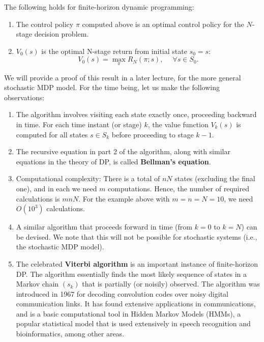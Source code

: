 \begin{proposition}
The following holds for finite-horizon dynamic programming:
\begin{enumerate}
  \item The control policy $\pi $ computed above is an optimal control policy for the $N$-stage decision problem.
  \item $V_0^{}(s)$ is the optimal N-stage return from initial state ${s_0} = s$:
\[{V_0}(s) = \mathop {\max }\limits_\pi  {R_N}(\pi ;s),\;\quad \forall s \in {S_0}.\]
\end{enumerate}
\end{proposition}

We will provide a proof of this result in a later lecture, for the more general stochastic MDP model. For the time being, let us make the following observations:
\begin{enumerate}
  \item The algorithm involves visiting each state exactly once, proceeding backward in time. For each time instant (or stage) $k$, the value function ${V_k}(s)$ is computed for all states $s \in {S_k}$ before proceeding to stage $k - 1$.
  \item The recursive equation in part 2 of the algorithm, along with similar equations in the theory of DP, is called \textbf{Bellman's equation}.
  \item Computational complexity: There is a total of $nN$ states (excluding the final one), and in each we need $m$ computations. Hence, the number of required calculations is $mnN$.
For the example above with $m = n = N = 10$, we need $O({10^3})$ calculations.
  \item A similar algorithm that proceeds forward in time (from $k = 0$ to $k = N$) can be devised. We note that this will not be possible for stochastic systems (i.e., the stochastic MDP model).
  \item The celebrated \textbf{Viterbi algorithm} is an important instance of finite-horizon DP. The algorithm essentially finds the most likely sequence of states in a Markov chain $({s_k})$ that is partially (or noisily) observed.
The algorithm was introduced in 1967 for decoding convolution codes over noisy digital communication links. It has found extensive applications in communications, and is a basic computational tool in Hidden Markov Models (HMMs), a popular statistical model that is used extensively in speech recognition and bioinformatics, among other areas.
\end{enumerate}

